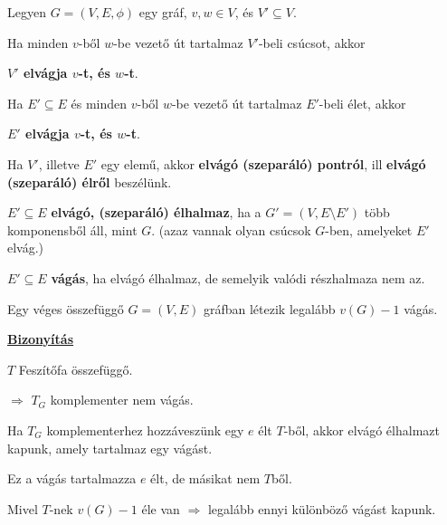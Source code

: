 \documentclass[10pt]{article}
\renewcommand{\\}{\par\noindent}
\begin{document}
\begin{frame}
\begin{tcolorbox}[title={Elvágó élhalmaz, vágás}]
Legyen $G =  (V, E, {\phi})$ egy gráf, $v, w \in V$, és $V' \subseteq V$.\\
\bigskip
Ha minden $v$-ből $w$-be vezető út tartalmaz $V'$-beli csúcsot, akkor\\
\medskip
\textbf{$V'$ elvágja $v$-t, és $w$-t}.\\
\medskip
Ha $E' \subseteq E$ és minden $v$-ből $w$-be vezető út tartalmaz $E'$-beli élet, akkor\\
\medskip
\textbf{$E'$ elvágja $v$-t, és $w$-t}.\\
\bigskip
Ha $V'$, illetve $E'$ egy elemű, akkor \textbf{elvágó (szeparáló) pontról}, ill \textbf{elvágó (szeparáló) élről} beszélünk.\\
\bigskip
$E' \subseteq E$ \textbf{elvágó, (szeparáló) élhalmaz}, ha a $G' = (V, E \setminus E')$ több komponensből áll, mint $G$. (azaz vannak olyan csúcsok $G$-ben, amelyeket $E'$ elvág.)\\
\bigskip
$E' \subseteq E$ \textbf{vágás}, ha elvágó élhalmaz, de semelyik  valódi részhalmaza nem az.
\end{tcolorbox}
\end{frame}

\begin{frame}
\begin{tcolorbox}[title={Tétel: Vágások száma}]
Egy véges összefüggő $G = (V, E)$ gráfban létezik legalább $v(G) - 1$ vágás.\\
\tcblower
\smallskip
\underline{\textbf{Bizonyítás}}\\
\medskip
\\
$T$ Feszítőfa összefüggő.\\
$\Rightarrow$ $T_G$ komplementer nem vágás.\\
Ha $T_G$ komplementerhez hozzáveszünk egy $e$ élt $T$-ből, akkor elvágó élhalmazt kapunk, amely tartalmaz egy vágást.\\
Ez a vágás tartalmazza $e$ élt, de másikat nem $T$ből.\\
Mivel $T$-nek $v(G) - 1$ éle van $\Rightarrow$ legalább ennyi különböző vágást kapunk.
\end{tcolorbox}
\end{frame}
\end{document}

